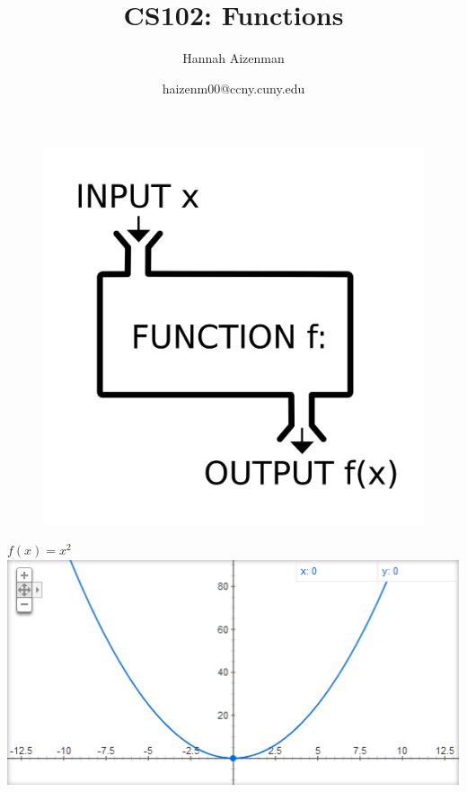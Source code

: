 \documentclass[xcolor={dvipsnames}]{beamer}
\begin{document}
\title{ CS102: Functions }
\author{Hannah Aizenman}
\date{haizenm00@ccny.cuny.edu}


\begin{frame}
	\titlepage
\end{frame}

\begin{frame}[plain]
		\begin{figure}
	\includegraphics[width=.9\textwidth]{function}
		\end{figure}
\end{frame}
\begin{frame}{$f(x)=x^{2}$}
	\includegraphics[width=1\textwidth]{xsq}
\end{frame}
\end{document}
